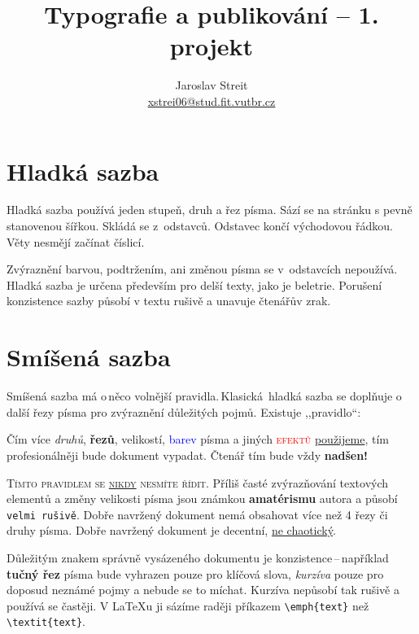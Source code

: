 \documentclass[twocolumn, 10pt, a4paper]{article}
\title{Typografie a publikování – 1. projekt}
\author{Jaroslav Streit\\
\href{mailto:xstrei06@stud.fit.vutbr.cz}{xstrei06@stud.fit.vutbr.cz}}
\date{}
\begin{document}
\maketitle

\section{Hladká sazba}

Hladká sazba používá jeden stupeň, druh a řez písma. Sází se na stránku s pevně stanovenou šířkou. Skládá se z~od\-stavců. Odstavec končí východovou řádkou.
Věty nesmějí začínat číslicí.

Zvýraznění barvou, podtržením, ani změnou písma se v~odstavcích nepoužívá.
Hladká sazba je určena především pro delší texty, jako je beletrie.
Porušení konzistence sazby působí v textu rušivě a unavuje čtenářův zrak.

\section{Smíšená sazba}
\label{section2}

Smíšená sazba má o\,něco volnější pravidla.\,Klasická~hladká sazba se doplňuje o další řezy písma pro zvýraznění důle\-žitých pojmů.
Existuje ,,pravidlo``:

\begin{adjustwidth}{20pt}{20pt}

\-\hspace{12pt} Čím více \textit{druhů}, \textbf{řezů}, {\huge velikostí}, \textcolor{blue}{barev} písma a jiných \textsc{\textcolor{red}{efektů}} \underline{použijeme}, tím \textcolor{orange(colorwheel)}{profesio\-nálněji} bude {\selectfont \Large{dokument}} vypadat. {\tiny Čtenář} tím bude vždy {\Huge \textbf{nadšen!}}
\end{adjustwidth}
\smallskip

\textsc{Tímto pravidlem se \underline{nikdy} nesmíte řídit.}
Příliš časté zvýrazňování textových elementů a změny {\tiny velikosti} písma jsou známkou \textbf{amatérismu} autora a působí \texttt{velmi rušivě}.
Dobře navržený dokument nemá obsahovat více než 4 řezy či druhy písma.
Dobře navržený dokument je decentní, \underline{ne chaotický}.

Důležitým znakem správně vysázeného dokumentu je konzistence\,--\,například \textbf{tučný řez} písma bude vyhrazen pouze pro klíčová slova, \textit{kurzíva} pouze pro doposud ne\-známé pojmy a nebude se to míchat.
Kurzíva nepůsobí tak rušivě a používá se častěji.
V \LaTeX u ji sázíme raději příkazem \verb=\emph{text}= než \verb=\textit{text}=.
\end{document}
